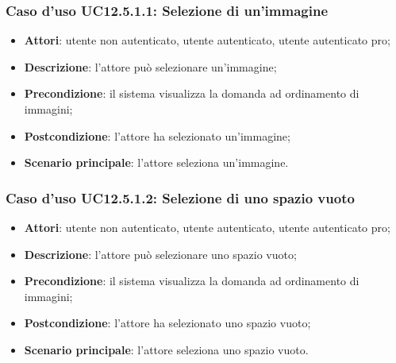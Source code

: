 \subsubsection{Caso d'uso UC12.5.1.1: Selezione di un'immagine}
\begin{itemize}
\item \textbf{Attori}: utente non autenticato, utente autenticato, utente autenticato pro;
\item \textbf{Descrizione}: l'attore può selezionare un'immagine;
\item \textbf{Precondizione}: il sistema visualizza la domanda ad ordinamento di immagini;
\item \textbf{Postcondizione}: l'attore ha selezionato un'immagine;
\item \textbf{Scenario principale}: l'attore seleziona un'immagine.
\end{itemize}

\subsubsection{Caso d'uso UC12.5.1.2: Selezione di uno spazio vuoto}
\begin{itemize}
\item \textbf{Attori}: utente non autenticato, utente autenticato, utente autenticato pro;
\item \textbf{Descrizione}: l'attore può selezionare uno spazio vuoto;
\item \textbf{Precondizione}: il sistema visualizza la domanda ad ordinamento di immagini;
\item \textbf{Postcondizione}: l'attore ha selezionato uno spazio vuoto;
\item \textbf{Scenario principale}: l'attore seleziona uno spazio vuoto.
\end{itemize}

